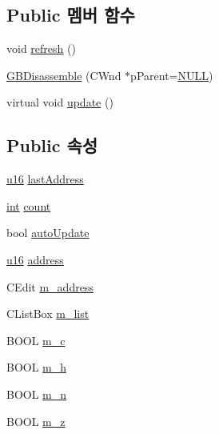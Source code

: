 \subsection*{Public 멤버 함수}
\begin{DoxyCompactItemize}
\item 
void \mbox{\hyperlink{class_g_b_disassemble_a0ae217c08ead8a3cf62c59dadaa27fde}{refresh}} ()
\item 
\mbox{\hyperlink{class_g_b_disassemble_a64795e9c53d508a948db15b940e707e5}{G\+B\+Disassemble}} (C\+Wnd $\ast$p\+Parent=\mbox{\hyperlink{_system_8h_a070d2ce7b6bb7e5c05602aa8c308d0c4}{N\+U\+LL}})
\item 
virtual void \mbox{\hyperlink{class_g_b_disassemble_a1170fe51e14d0b770f5200bf4e193423}{update}} ()
\end{DoxyCompactItemize}
\subsection*{Public 속성}
\begin{DoxyCompactItemize}
\item 
\mbox{\hyperlink{_system_8h_a9e6c91d77e24643b888dbd1a1a590054}{u16}} \mbox{\hyperlink{class_g_b_disassemble_ac1e3b7cd4e945eff2d9d89f14c4cbca9}{last\+Address}}
\item 
\mbox{\hyperlink{_util_8cpp_a0ef32aa8672df19503a49fab2d0c8071}{int}} \mbox{\hyperlink{class_g_b_disassemble_a656a8c8553caae166131f58e924129f5}{count}}
\item 
bool \mbox{\hyperlink{class_g_b_disassemble_ac61f998dee99af2b137fe45297a5715a}{auto\+Update}}
\item 
\mbox{\hyperlink{_system_8h_a9e6c91d77e24643b888dbd1a1a590054}{u16}} \mbox{\hyperlink{class_g_b_disassemble_afcfc78edb6d25dc9ef3f0ae25ac6731f}{address}}
\item 
C\+Edit \mbox{\hyperlink{class_g_b_disassemble_ae307e3f799572b623e21bb94c345c5ce}{m\+\_\+address}}
\item 
C\+List\+Box \mbox{\hyperlink{class_g_b_disassemble_a9c85552a373d70a612231c68d2702658}{m\+\_\+list}}
\item 
B\+O\+OL \mbox{\hyperlink{class_g_b_disassemble_aa5e67e4603c41c05ed19f599336139be}{m\+\_\+c}}
\item 
B\+O\+OL \mbox{\hyperlink{class_g_b_disassemble_a2756a29fdbf8424bd977ea326b00b9e7}{m\+\_\+h}}
\item 
B\+O\+OL \mbox{\hyperlink{class_g_b_disassemble_acd44f179ab1fc59a252e21370ce183e9}{m\+\_\+n}}
\item 
B\+O\+OL \mbox{\hyperlink{class_g_b_disassemble_a3fe7947162446aea8ba1dcb1e6920b60}{m\+\_\+z}}
\end{DoxyCompactItemize}
